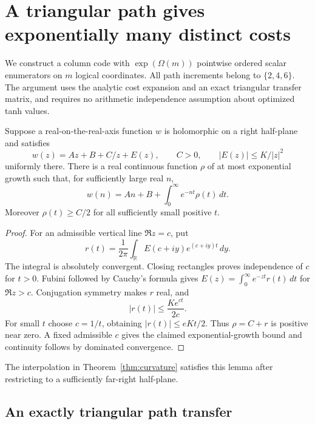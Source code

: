 \section{A triangular path gives exponentially many distinct costs}
\label{sec:cycles}

We construct a column code with $\exp(\Omega(m))$ pointwise ordered
scalar enumerators on $m$ logical coordinates. All path increments
belong to $\{2,4,6\}$. The argument uses the analytic cost expansion
and an exact triangular transfer matrix, and requires no arithmetic
independence assumption about optimized tanh values.

\begin{lemma}
\label{lem:laplace-kernel}
Suppose a real-on-the-real-axis function $w$ is holomorphic on a right
half-plane and satisfies
\[
 w(z)=Az+B+C/z+E(z),\qquad C>0,\qquad |E(z)|\le K/|z|^2
\]
uniformly there. There is a real continuous function $\rho$ of at most
exponential growth such that, for sufficiently large real $n$,
\[
 w(n)=An+B+\int_0^\infty e^{-nt}\rho(t)\,dt.
\]
Moreover $\rho(t)\ge C/2$ for all sufficiently small positive $t$.
\end{lemma}
\begin{proof}
For an admissible vertical line $\Re z=c$, put
\[
 r(t)=\frac1{2\pi}\int_{\mathbb R}E(c+iy)e^{(c+iy)t}\,dy.
\]
The integral is absolutely convergent. Closing rectangles proves
independence of $c$ for $t>0$. Fubini followed by Cauchy's formula gives
$E(z)=\int_0^\infty e^{-zt}r(t)\,dt$ for $\Re z>c$.
Conjugation symmetry makes $r$ real, and
\[
 |r(t)|\le\frac{K e^{ct}}{2c}.
\]
For small $t$ choose $c=1/t$, obtaining $|r(t)|\le eKt/2$.
Thus $\rho=C+r$ is positive near zero. A fixed admissible $c$ gives
the claimed exponential-growth bound and continuity follows by
dominated convergence.
\end{proof}

The interpolation in Theorem~\ref{thm:curvature} satisfies this lemma
after restricting to a sufficiently far-right half-plane.

\subsection{An exactly triangular path transfer}

